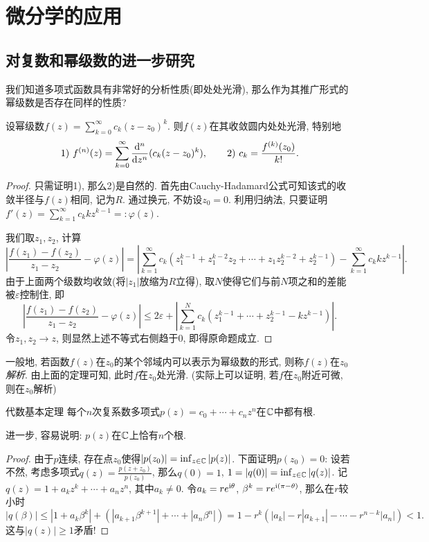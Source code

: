 \newpage
\section{微分学的应用}

\subsection{对复数和幂级数的进一步研究}

我们知道多项式函数具有非常好的分析性质(即处处光滑), 那么作为其推广形式的幂级数是否存在同样的性质? 

\begin{theorem}{}
	设幂级数$f(z)=\sum_{k=0}^{\infty} c_k(z-z_0)^k$. 则$f(z)$在其收敛圆内处处光滑, 特别地$$1)~f^{(n)}(z) = \sum_{k=0}^{\infty} \frac{\mathop{}\!\mathrm{d} ^n}{\mathop{}\!\mathrm{d} z^n} (c_k(z-z_0)^k),\qquad 2)~c_k=\frac{f^{(k)}(z_0)}{k!}.$$
\end{theorem}
\begin{proof}
	只需证明1), 那么2)是自然的. 首先由Cauchy-Hadamard公式可知该式的收敛半径与$f(z)$相同, 记为$R$. 通过换元, 不妨设$z_0=0$. 利用归纳法, 只要证明$f'(z)=\sum_{k=1}^{\infty}c_kkz^{k-1}=:\varphi (z)$. 
	
	我们取$z_1,z_2$, 计算$$\left| \frac{f(z_1)-f(z_2)}{z_1-z_2} - \varphi (z) \right| = \left| \sum_{k=1}^{\infty} c_k(z_1^{k-1}+ z_1^{k-2}z_2 + \cdots + z_1z_2^{k-2} + z_2^{k-1}) - \sum_{k=1}^{\infty} c_kkz^{k-1} \right|.$$
	由于上面两个级数均收敛(将$|z_1|$放缩为$R$立得), 取$N$使得它们与前$N$项之和的差能被$\varepsilon$控制住, 即$$\left| \frac{f(z_1)-f(z_2)}{z_1-z_2} - \varphi (z) \right| \leq 2\varepsilon + \left| \sum_{k=1}^{N} c_k(z_1^{k-1} + \cdots + z_2^{k-1} - kz^{k-1}) \right|.$$
	令$z_1,z_2 \to z$, 则显然上述不等式右侧趋于$0$, 即得原命题成立. 
\end{proof}

一般地, 若函数$f(z)$在$z_0$的某个邻域内可以表示为幂级数的形式, 则称$f(z)$在$z_0$\textit{解析}. 由上面的定理可知, 此时$f$在$z_0$处光滑. (实际上可以证明, 若$f$在$z_0$附近可微, 则在$z_0$解析)

\begin{theorem}{代数基本定理}
	每个$n$次复系数多项式$p(z)=c_0+\cdots +c_nz^n$在$\mathbb{C}$中都有根. 
\end{theorem}
\begin{remark}
	进一步, 容易说明: $p(z)$在$\mathbb{C}$上恰有$n$个根. 
\end{remark}
\begin{proof}
	由于$p$连续, 存在点$z_0$使得$|p(z_0)|=\inf_{z \in \mathbb{C}}|p(z)|$. 下面证明$p(z_0)=0$: 设若不然, 考虑多项式$q(z)=\frac{p(z+z_0)}{p(z_0)}$, 那么$q(0)=1$, $1= |q(0)|=\inf_{z \in \mathbb{C}} |q(z)|$. 记$q(z)=1+a_kz^k+\cdots +a_nz^n$, 其中$a_k \neq 0$. 令$a_k=re^{\mathrm{i} \theta}$, $\beta ^k = re^{\mathrm{i} (\pi-\theta)}$, 那么在$r$较小时$$|q(\beta)| \leq |1+a_k\beta ^k| + (|a_{k+1}\beta ^{k+1}| + \cdots + |a_n\beta ^n|) = 1-r^k(|a_k|-r|a_{k+1}|-\cdots -r^{n-k}|a_n|) <1.$$
	这与$|q(z)| \geq 1$矛盾! 
\end{proof}

